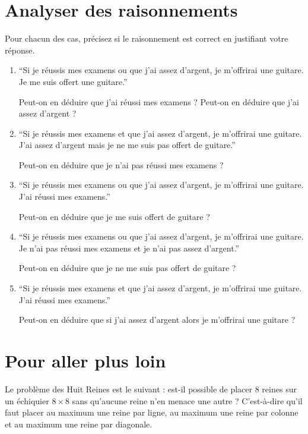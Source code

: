 \documentclass[a4paper,11pt]{article}
\begin{document}
\section{Analyser des raisonnements}

Pour chacun des cas, précisez si le raisonnement est correct en justifiant votre réponse.

\begin{enumerate}
\item ``Si je réussis mes examens ou que j'ai assez d'argent, je m'offrirai une guitare. Je me suis offert une guitare.''

Peut-on en déduire que j'ai réussi mes examens ? Peut-on en déduire que j'ai assez d'argent ?

\item ``Si je réussis mes examens et que j'ai assez d'argent, je m'offrirai une guitare. J'ai assez d'argent mais je ne me suis pas offert de guitare.''

Peut-on en déduire que je n'ai pas réussi mes examens ?

\item ``Si je réussis mes examens ou que j'ai assez d'argent, je m'offrirai une guitare. J'ai réussi mes examens.''

Peut-on en déduire que je me suis offert de guitare ?

\item ``Si je réussis mes examens ou que j'ai assez d'argent, je m'offrirai une guitare. Je n'ai pas réussi mes examens et je n'ai pas assez d'argent.''

Peut-on en déduire que je ne me suis pas offert de guitare ?

\item ``Si je réussis mes examens et que j'ai assez d'argent, je m'offrirai une guitare. J'ai réussi mes examens.''

Peut-on en déduire que si j'ai assez d'argent alors je m'offrirai une guitare ?
\end{enumerate}

\section{Pour aller plus loin}

Le problème des Huit Reines est le suivant : est-il possible de placer 8 reines sur un échiquier $8 \times 8$ sans qu'aucune reine n'en menace une autre ? C'est-à-dire qu'il faut placer au maximum une reine par ligne, au maximum une reine par colonne et au maximum une reine par diagonale.
\end{document}

